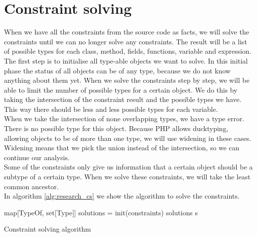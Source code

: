 \documentclass[../main.tex]{subfiles}
\begin{document}
    \section{Constraint solving}\label{sec:research:constraint_solving}
    When we have all the constraints from the source code as facts, we will solve the constraints until we can no longer solve any constraints.
    The result will be a list of possible types for each class, method, fields, functions, variable and expression.
    \\
    The first step is to initialise all type-able objects we want to solve.
    In this initial phase the status of all objects can be of any type, because we do not know anything about them yet.
    When we solve the constraints step by step, we will be able to limit the number of possible types for a certain object.
    We do this by taking the intersection of the constraint result and the possible types we have.
    This way there should be less and less possible types for each variable.
    \\
    When we take the intersection of none overlapping types, we have a type error.
    There is no possible type for this object.
    Because PHP allows ducktyping, allowing objects to be of more than one type, we will use widening in these cases.
    Widening means that we pick the union instead of the intersection, so we can continue our analysis.
    \\
    Some of the constraints only give us information that a certain object should be a subtype of a certain type.
    When we solve these constraints, we will take the least common ancestor.
    \\
    In algorithm \ref{alg:research_cs} we show the algorithm to solve the constraints.
    
    \vspace{5 mm}
    \begin{algorithm}[H]
     \BlankLine
	 map[TypeOf, set[Type]] solutions = init(constraints)\;           \label{alg:research_cs:init_solutions}
     \BlankLine
	                                                                  \label{alg:research_cs:loop_end}
	 \BlankLine
	 \Return solutions\;     \label{alg:research_cs:return}s
	 \caption{Constraint solving algorithm}
	 \label{alg:research_cs}
	\end{algorithm}
    
\end{document}
